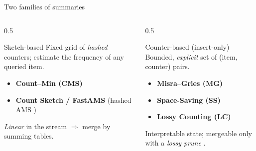 \documentclass[11pt,aspectratio=169]{beamer}
\begin{document}
\begin{frame}{Two families of summaries}
  \begin{columns}[t]
    \begin{column}{0.5\textwidth}
      \begin{block}{\textcolor{sketchcol}{Sketch-based}}
        Fixed grid of \emph{hashed} counters; estimate the frequency of any queried item.
        \begin{itemize}
          \item \textbf{Count--Min (CMS)} \cite{cormodeImprovedDataStream2005}
          \item \textbf{Count Sketch / FastAMS} \cite{charikarFindingFrequentItems2002}
                (hashed AMS \cite{alonSpaceComplexityApproximating1999})
        \end{itemize}
        \textit{Linear} in the stream $\Rightarrow$ merge by summing tables.
      \end{block}
    \end{column}
    \begin{column}{0.5\textwidth}
      \begin{block}{\textcolor{countercol}{Counter-based (insert-only)}}
        Bounded, \emph{explicit} set of (item, counter) pairs.
        \begin{itemize}
          \item \textbf{Misra--Gries (MG)} \cite{misraFindingRepeatedElements1982}
          \item \textbf{Space-Saving (SS)} \cite{metwallyEfficientComputationFrequent2005}
          \item \textbf{Lossy Counting (LC)} \cite{mankuApproximateFrequencyCounts2002}
        \end{itemize}
        Interpretable state; mergeable only with a \emph{lossy prune}
        \cite{agarwalMergeableSummaries2013}.
      \end{block}
    \end{column}
  \end{columns}
\end{frame}

\end{document}
